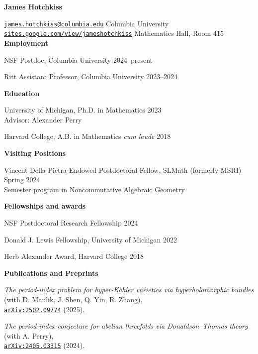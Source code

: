 \documentclass[11 pt]{letter}
\begin{document}
	\noindent
	\begin{center}
	 	\textbf{\Large James Hotchkiss}
	 \end{center} 
	\hrulefill 

	\noindent \href{mailto:james.hotchkiss@columbia.edu}{\nolinkurl{james.hotchkiss@columbia.edu}} \hfill Columbia University \\
	\href{https://sites.google.com/view/jameshotchkiss/james-hotchkiss}{\nolinkurl{sites.google.com/view/jameshotchkiss}}  \hfill Mathematics Hall, Room 415 \\



	\noindent
	\textbf{\large{Employment}}

	NSF Postdoc, Columbia University \hfill 2024--present

	Ritt Assistant Professor, Columbia University \hfill 2023--2024


	\noindent
	\textbf{\large{Education}}

	University of Michigan, Ph.D. in Mathematics \hfill 2023 \\
	\indent Advisor: Alexander Perry

	Harvard College, A.B. in Mathematics \textit{cum laude} \hfill 2018

	\noindent
	\textbf{\large{Visiting Positions}}

	Vincent Della Pietra Endowed Postdoctoral Fellow, SLMath (formerly MSRI) \hfill Spring 2024 \\
	\indent Semester program in Noncommutative Algebraic Geometry

	\medskip
	\noindent
	\textbf{\large{Fellowships and awards}}

	NSF Postdoctoral Research Fellowship \hfill 2024

	Donald J. Lewis Fellowship, University of Michigan \hfill 2022 

	Herb Alexander Award, Harvard College \hfill 2018


	\medskip
	\noindent
	\textbf{\large{Publications and Preprints}}

	\emph{The period-index problem for hyper-K\"ahler varieties via hyperholomorphic bundles} \\ 
	\indent (with D. Maulik, J. Shen, Q. Yin, R. Zhang), \\
	\indent \href{https://arxiv.org/abs/2502.09774}{\nolinkurl{arXiv:2502.09774}} (2025).

	\emph{The period-index conjecture for abelian threefolds via Donaldson--Thomas theory} \\ 
	\indent (with A. Perry), \\
	\indent \href{https://arxiv.org/abs/2405.03315}{\nolinkurl{arXiv:2405.03315}} (2024).
\end{document}
